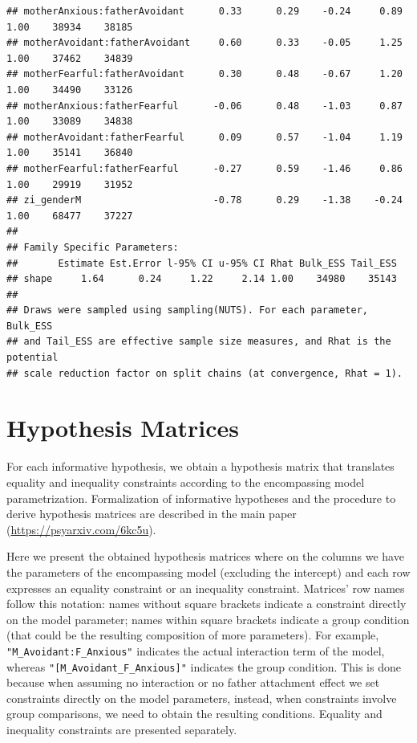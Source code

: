 \documentclass[
]{book}
\begin{document}
\begin{verbatim}
## motherAnxious:fatherAvoidant      0.33      0.29    -0.24     0.89 1.00    38934    38185
## motherAvoidant:fatherAvoidant     0.60      0.33    -0.05     1.25 1.00    37462    34839
## motherFearful:fatherAvoidant      0.30      0.48    -0.67     1.20 1.00    34490    33126
## motherAnxious:fatherFearful      -0.06      0.48    -1.03     0.87 1.00    33089    34838
## motherAvoidant:fatherFearful      0.09      0.57    -1.04     1.19 1.00    35141    36840
## motherFearful:fatherFearful      -0.27      0.59    -1.46     0.86 1.00    29919    31952
## zi_genderM                       -0.78      0.29    -1.38    -0.24 1.00    68477    37227
## 
## Family Specific Parameters: 
##       Estimate Est.Error l-95% CI u-95% CI Rhat Bulk_ESS Tail_ESS
## shape     1.64      0.24     1.22     2.14 1.00    34980    35143
## 
## Draws were sampled using sampling(NUTS). For each parameter, Bulk_ESS
## and Tail_ESS are effective sample size measures, and Rhat is the potential
## scale reduction factor on split chains (at convergence, Rhat = 1).
\end{verbatim}

\hypertarget{hypothesis-matrices}{%
\section{Hypothesis Matrices}\label{hypothesis-matrices}}

For each informative hypothesis, we obtain a hypothesis matrix that translates equality and inequality constraints according to the encompassing model parametrization. Formalization of informative hypotheses and the procedure to derive hypothesis matrices are described in the main paper (\url{https://psyarxiv.com/6kc5u}).

Here we present the obtained hypothesis matrices where on the columns we have the parameters of the encompassing model (excluding the intercept) and each row expresses an equality constraint or an inequality constraint. Matrices' row names follow this notation: names without square brackets indicate a constraint directly on the model parameter; names within square brackets indicate a group condition (that could be the resulting composition of more parameters). For example, \texttt{"M\_Avoidant:F\_Anxious"} indicates the actual interaction term of the model, whereas \texttt{"{[}M\_Avoidant\_F\_Anxious{]}"} indicates the group condition. This is done because when assuming no interaction or no father attachment effect we set constraints directly on the model parameters, instead, when constraints involve group comparisons, we need to obtain the resulting conditions. Equality and inequality constraints are presented separately.
\end{document}
